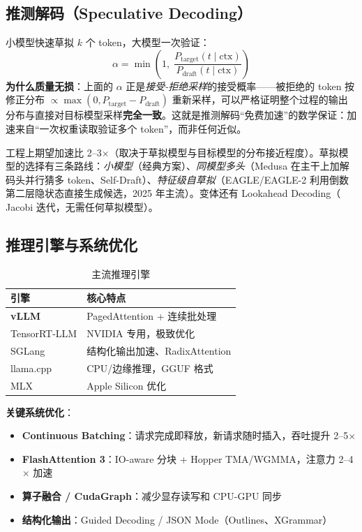 \documentclass[12pt,a4paper]{article}
\begin{document}
\subsection{推测解码（Speculative Decoding）}

小模型快速草拟 $k$ 个 token，大模型一次验证：
\[
\alpha = \min\!\left(1,\; \frac{P_{\text{target}}(t \mid \text{ctx})}{P_{\text{draft}}(t \mid \text{ctx})}\right)
\]
\textbf{为什么质量无损}：上面的 $\alpha$ 正是\emph{接受-拒绝采样}的接受概率——被拒绝的 token 按修正分布 $\propto \max(0, P_{\text{target}} - P_{\text{draft}})$ 重新采样，可以严格证明整个过程的输出分布与直接对目标模型采样\textbf{完全一致}。这就是推测解码“免费加速”的数学保证：加速来自“一次权重读取验证多个 token”，而非任何近似。

工程上期望加速比 2--3$\times$（取决于草拟模型与目标模型的分布接近程度）。草拟模型的选择有三条路线：\emph{小模型}（经典方案）、\emph{同模型多头}（Medusa 在主干上加解码头并行猜多 token、Self-Draft）、\emph{特征级自草拟}（EAGLE/EAGLE-2 利用倒数第二层隐状态直接生成候选，2025 年主流）。变体还有 Lookahead Decoding（ Jacobi 迭代，无需任何草拟模型）。

\subsection{推理引擎与系统优化}

\begin{table}[htbp]
\centering
\small
\begin{tabular}{@{}ll@{}}
\toprule
\textbf{引擎} & \textbf{核心特点}\\
\midrule
\textbf{vLLM} & PagedAttention + 连续批处理\\
TensorRT-LLM & NVIDIA 专用，极致优化\\
SGLang & 结构化输出加速、RadixAttention\\
llama.cpp & CPU/边缘推理，GGUF 格式\\
MLX & Apple Silicon 优化\\
\bottomrule
\end{tabular}
\caption{主流推理引擎}
\end{table}

\textbf{关键系统优化}：
\begin{itemize}
  \item \textbf{Continuous Batching}：请求完成即释放，新请求随时插入，吞吐提升 2--5$\times$
  \item \textbf{FlashAttention 3}：IO-aware 分块 + Hopper TMA/WGMMA，注意力 2--4$\times$ 加速
  \item \textbf{算子融合 / CudaGraph}：减少显存读写和 CPU-GPU 同步
  \item \textbf{结构化输出}：Guided Decoding / JSON Mode（Outlines、XGrammar）
\end{itemize}
\end{document}
